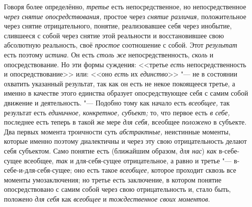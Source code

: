Говоря более определённо, {\em третье} есть
непосредственное, но непосредственное
{\em через снятие опосредствования,} простое через {\em снятие
различия,} положительное через снятие отрицательного,
понятие, реализовавшее себя через инобытие, слившееся с собой через снятие
этой реальности и восстановившее свою абсолютную реальность, своё
{\em простое} соотношение с собой. Этот {\em результат} есть поэтому
{\em истина}. Он есть {\em столь же} непосредственность, {\em сколь} и
опосредствование. Но эти формы суждения: <<третье {\em есть}
непосредственность и опосредствование>> или: <<оно {\em есть} их
{\em единство}>> "--- не в
состоянии охватить указанный результат, так как он есть не некое покоящееся
третье, а именно в качестве этого единства образует опосредствующее себя с
самим собой движение и деятельность. "--- Подобно тому как
начало есть {\em всеобщее,} так результат есть
{\em единичное, конкретное, субъект;} то, что первое есть {\em в
себе,} последнее есть теперь в такой же мере {\em для себя,} всеобщее
{\em положено} в субъекте. Два первых момента троичности суть
{\em абстрактные,} неистинные моменты, которые именно поэтому диалектичны и
через эту свою отрицательность делают себя субъектом. Само понятие есть
(ближайшим образом, {\em для нас}) {\em как} в-себе-сущее
всеобщее, {\em так} и для-себя-сущее отрицательное, а равно и третье
"--- в-себе-и-для-себя-сущее; оно есть такое {\em всеобщее,} которое
проходит сквозь все моменты умозаключения; но третье есть заключение, в
котором понятие опосредствовано с самим собой через свою отрицательность и,
стало быть, положено {\em для себя} как {\em всеобщее}
и {\em тождественное своих моментов}.

